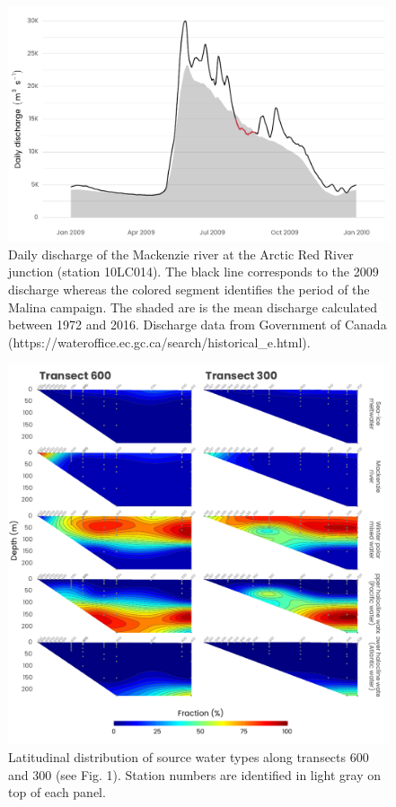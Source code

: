 \documentclass[essd, manuscript]{copernicus}
\begin{document}
\clearpage

\begin{figure}[H]
	\centering
	\includegraphics[scale = 1]{../../../graphs/fig02.pdf}
	\caption{Daily discharge of the Mackenzie river at the Arctic Red River junction (station 10LC014). The black line corresponds to the 2009 discharge whereas the colored segment identifies the period of the Malina campaign. The shaded are is the mean discharge calculated between 1972 and 2016. Discharge data from Government of Canada (https://wateroffice.ec.gc.ca/search/historical\_e.html).}
\end{figure}

\clearpage

\begin{figure}[H]
	\centering
	\includegraphics[scale = 1]{../../../graphs/fig03.pdf}
	\caption{Latitudinal distribution of source water types along transects 600 and 300 (see Fig. 1). Station numbers are identified in light gray on top of each panel.}
\end{figure}
\end{document}
